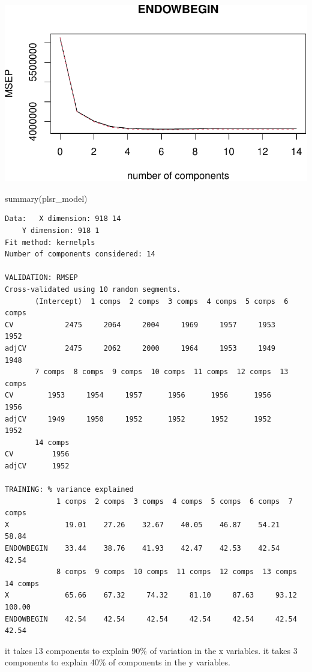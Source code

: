 \documentclass[
  letterpaper,
  DIV=11,
  numbers=noendperiod]{scrartcl}
\newenvironment{Shaded}{\begin{snugshade}}{\end{snugshade}}
\newcommand{\FunctionTok}[1]{\textcolor[rgb]{0.28,0.35,0.67}{#1}}
\newcommand{\NormalTok}[1]{\textcolor[rgb]{0.00,0.23,0.31}{#1}}
\begin{document}
\includegraphics{Final_627_Tshiani_files/figure-pdf/unnamed-chunk-16-1.pdf}

\begin{Shaded}
\begin{Highlighting}[]
\FunctionTok{summary}\NormalTok{(plsr\_model)}
\end{Highlighting}
\end{Shaded}

\begin{verbatim}
Data:   X dimension: 918 14 
    Y dimension: 918 1
Fit method: kernelpls
Number of components considered: 14

VALIDATION: RMSEP
Cross-validated using 10 random segments.
       (Intercept)  1 comps  2 comps  3 comps  4 comps  5 comps  6 comps
CV            2475     2064     2004     1969     1957     1953     1952
adjCV         2475     2062     2000     1964     1953     1949     1948
       7 comps  8 comps  9 comps  10 comps  11 comps  12 comps  13 comps
CV        1953     1954     1957      1956      1956      1956      1956
adjCV     1949     1950     1952      1952      1952      1952      1952
       14 comps
CV         1956
adjCV      1952

TRAINING: % variance explained
            1 comps  2 comps  3 comps  4 comps  5 comps  6 comps  7 comps
X             19.01    27.26    32.67    40.05    46.87    54.21    58.84
ENDOWBEGIN    33.44    38.76    41.93    42.47    42.53    42.54    42.54
            8 comps  9 comps  10 comps  11 comps  12 comps  13 comps  14 comps
X             65.66    67.32     74.32     81.10     87.63     93.12    100.00
ENDOWBEGIN    42.54    42.54     42.54     42.54     42.54     42.54     42.54
\end{verbatim}

it takes 13 components to explain 90\% of variation in the x variables.
it takes 3 components to explain 40\% of components in the y variables.
\end{document}
